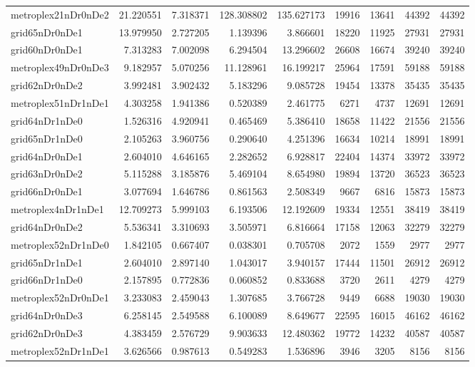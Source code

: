 \begin{longtable}{|l|r|r|r|r|r|r|r|r|}
metroplex21nDr0nDe2 & 21.220551 & 7.318371 & 128.308802 & 135.627173 & 19916 & 13641 & 44392 & 44392 \\
grid65nDr0nDe1 & 13.979950 & 2.727205 & 1.139396 & 3.866601 & 18220 & 11925 & 27931 & 27931 \\
grid60nDr0nDe1 & 7.313283 & 7.002098 & 6.294504 & 13.296602 & 26608 & 16674 & 39240 & 39240 \\
metroplex49nDr0nDe3 & 9.182957 & 5.070256 & 11.128961 & 16.199217 & 25964 & 17591 & 59188 & 59188 \\
grid62nDr0nDe2 & 3.992481 & 3.902432 & 5.183296 & 9.085728 & 19454 & 13378 & 35435 & 35435 \\
metroplex51nDr1nDe1 & 4.303258 & 1.941386 & 0.520389 & 2.461775 & 6271 & 4737 & 12691 & 12691 \\
grid64nDr1nDe0 & 1.526316 & 4.920941 & 0.465469 & 5.386410 & 18658 & 11422 & 21556 & 21556 \\
grid65nDr1nDe0 & 2.105263 & 3.960756 & 0.290640 & 4.251396 & 16634 & 10214 & 18991 & 18991 \\
grid64nDr0nDe1 & 2.604010 & 4.646165 & 2.282652 & 6.928817 & 22404 & 14374 & 33972 & 33972 \\
grid63nDr0nDe2 & 5.115288 & 3.185876 & 5.469104 & 8.654980 & 19894 & 13720 & 36523 & 36523 \\
grid66nDr0nDe1 & 3.077694 & 1.646786 & 0.861563 & 2.508349 & 9667 & 6816 & 15873 & 15873 \\
metroplex4nDr1nDe1 & 12.709273 & 5.999103 & 6.193506 & 12.192609 & 19334 & 12551 & 38419 & 38419 \\
grid64nDr0nDe2 & 5.536341 & 3.310693 & 3.505971 & 6.816664 & 17158 & 12063 & 32279 & 32279 \\
metroplex52nDr1nDe0 & 1.842105 & 0.667407 & 0.038301 & 0.705708 & 2072 & 1559 & 2977 & 2977 \\
grid65nDr1nDe1 & 2.604010 & 2.897140 & 1.043017 & 3.940157 & 17444 & 11501 & 26912 & 26912 \\
grid66nDr1nDe0 & 2.157895 & 0.772836 & 0.060852 & 0.833688 & 3720 & 2611 & 4279 & 4279 \\
metroplex52nDr0nDe1 & 3.233083 & 2.459043 & 1.307685 & 3.766728 & 9449 & 6688 & 19030 & 19030 \\
grid64nDr0nDe3 & 6.258145 & 2.549588 & 6.100089 & 8.649677 & 22595 & 16015 & 46162 & 46162 \\
grid62nDr0nDe3 & 4.383459 & 2.576729 & 9.903633 & 12.480362 & 19772 & 14232 & 40587 & 40587 \\
metroplex52nDr1nDe1 & 3.626566 & 0.987613 & 0.549283 & 1.536896 & 3946 & 3205 & 8156 & 8156 \\

\end{longtable}
